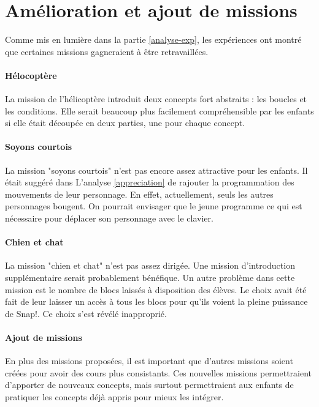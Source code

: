 \section{Amélioration et ajout de missions}
Comme mis en lumière dans la partie \ref{analyse-exp}, les expériences ont montré que certaines missions gagneraient à être retravaillées.

\paragraph{Hélocoptère}
La mission de l'hélicoptère introduit deux concepts fort abstraits : les boucles et les conditions. Elle serait beaucoup plus facilement compréhensible par les enfants si elle était découpée en deux parties, une pour chaque concept.

\paragraph{Soyons courtois}
La mission "soyons courtois" n'est pas encore assez attractive pour les enfants. Il était suggéré dans L'analyse \ref{appreciation} de rajouter la programmation des mouvements de leur personnage. En effet, actuellement, seuls les autres personnages bougent. On pourrait envisager que le jeune programme ce qui est nécessaire pour déplacer son personnage avec le clavier.

\paragraph{Chien et chat}
La mission "chien et chat" n'est pas assez dirigée. Une mission d'introduction supplémentaire serait probablement bénéfique. Un autre problème dans cette mission est le nombre de blocs laissés à disposition des élèves. Le choix avait été fait de leur laisser un accès à tous les blocs pour qu'ils voient la pleine puissance de Snap!. Ce choix s'est révélé inapproprié. %

\paragraph{Ajout de missions}
En plus des missions proposées, il est important que d'autres missions soient créées pour avoir des cours plus consistants. Ces nouvelles missions permettraient d'apporter de nouveaux concepts, mais surtout permettraient aux enfants de pratiquer les concepts déjà appris pour mieux les intégrer. %


